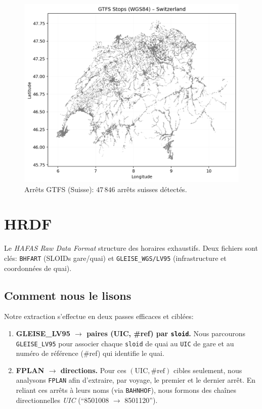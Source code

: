 \begin{figure}[h]
  \centering
  \includegraphics[width=.76\linewidth]{figures/plots/gtfs_points_switzerland.png}
  \caption[Arrêts GTFS (Suisse)]{Arrêts GTFS (Suisse): \(47\,846\) arrêts suisses détectés.}
  \label{fig:gtfs_ch_points}
\end{figure}




\vspace{.2em}

\section{HRDF}
Le \textit{HAFAS Raw Data Format} structure des horaires exhaustifs. Deux fichiers sont clés: \texttt{BHFART} (SLOIDs gare/quai) et \texttt{GLEISE\_WGS/LV95} (infrastructure et coordonnées de quai).

\subsection{Comment nous le lisons}
Notre extraction s’effectue en deux passes efficaces et ciblées:
\begin{enumerate}
  \item \textbf{GLEISE\_LV95 \(\to\) paires (UIC, \#ref) par \texttt{sloid}.} Nous parcourons \texttt{GLEISE\_LV95} pour associer chaque \texttt{sloid} de quai au \texttt{UIC} de gare et au numéro de référence (\#ref) qui identifie le quai.
  \item \textbf{FPLAN \(\to\) directions.} Pour ces \((\text{UIC}, \#\text{ref})\) cibles seulement, nous analysons \texttt{FPLAN} afin d’extraire, par voyage, le premier et le dernier arrêt. En reliant ces arrêts à leurs noms (via \texttt{BAHNHOF}), nous formons des chaînes directionnelles \textit{UIC} (\enquote{8501008 \(\to\) 8501120}).
\end{enumerate}




